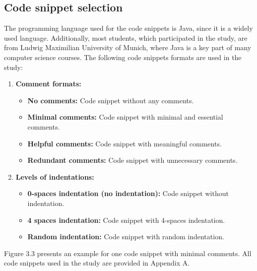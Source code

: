 \subsection{Code snippet selection}

The programming language used for the code snippets is Java, since it is a widely used language.  Additionally, most students, which participated in the study, are from Ludwig Maximilian University of Munich, where Java is a key part of many computer science courses. The following code snippets formats are used in the study:



\begin{enumerate}
    \item \textbf{Comment formats:}
    \begin{itemize}
        \item \textbf{No comments:} Code snippet without any comments.
        \item \textbf{Minimal comments:} Code snippet with minimal and essential comments.
        \item \textbf{Helpful comments:} Code snippet with meaningful comments.
        \item \textbf{Redundant comments:} Code snippet with unnecessary comments.
    \end{itemize}
    
    \item \textbf{Levels of indentations:}
    \begin{itemize}
        \item \textbf{0-spaces indentation (no indentation):} Code snippet without indentation.
        \item \textbf{4 spaces indentation:} Code snippet with 4-spaces indentation.
        \item \textbf{Random indentation:} Code snippet with random indentation.
    \end{itemize}
\end{enumerate}

Figure 3.3  presents an example for one code snippet with minimal comments. All code snippets used in the study are provided in Appendix A.

